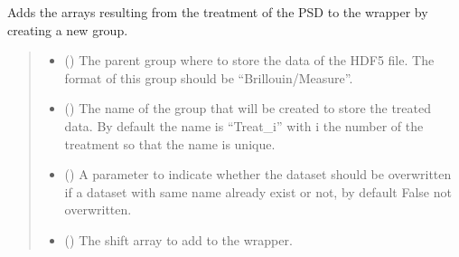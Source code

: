 \documentclass[letterpaper,10pt,english]{sphinxmanual}
\begin{document}
\begin{fulllineitems}
\begin{fulllineitems}
\label{\detokenize{source/HDF5_BLS:HDF5_BLS.wrapper.Wrapper.add_treated_data}}
\pysigstartsignatures
\pysiglinewithargsret
{}
{\sphinxparamcomma {}\sphinxparamcomma {}\sphinxparamcomma {}}
{}
\pysigstopsignatures
\sphinxAtStartPar
Adds the arrays resulting from the treatment of the PSD to the wrapper by creating a new group.
\begin{quote}\begin{description}
\begin{itemize}
\item {} 
\sphinxAtStartPar
{} (\sphinxstyleliteralemphasis{\sphinxupquote{, }}) \textendash{} The parent group where to store the data of the HDF5 file. The format of this group should be “Brillouin/Measure”.

\item {} 
\sphinxAtStartPar
{} (\sphinxstyleliteralemphasis{\sphinxupquote{, }}) \textendash{} The name of the group that will be created to store the treated data. By default the name is “Treat\_i” with i the number of the treatment so that the name is unique.

\item {} 
\sphinxAtStartPar
{} (\sphinxstyleliteralemphasis{\sphinxupquote{, }}) \textendash{} A parameter to indicate whether the dataset should be overwritten if a dataset with same name already exist or not, by default False \sphinxhyphen{} not overwritten.

\item {} 
\sphinxAtStartPar
{} (\sphinxstyleliteralemphasis{\sphinxupquote{, }}) \textendash{} The shift array to add to the wrapper.


\end{itemize}
\end{description}
\end{quote}
\end{fulllineitems}
\end{fulllineitems}
\end{document}
